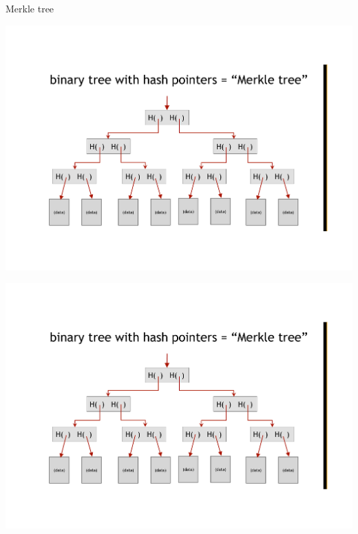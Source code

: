 \begin{frame}{Merkle tree}


\begin{overprint}
\begin{center}
\includegraphics[width=\textwidth,page=1]{merkle-tree}
\end{center}
\begin{center}
\includegraphics[width=\textwidth,page=2]{merkle-tree}
\end{center}
\end{overprint}
	
\end{frame}

